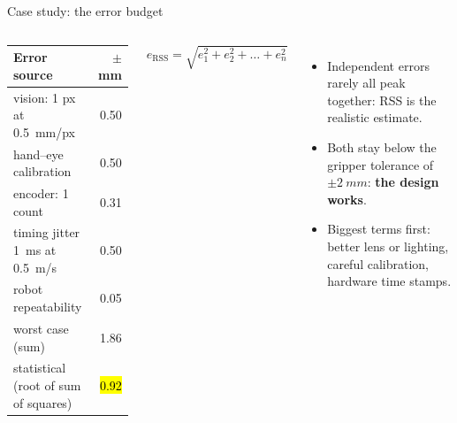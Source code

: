 \documentclass[aspectratio=169,10pt]{beamer}
\begin{document}
\begin{frame}{Case study: the error budget}
\begin{columns}[T]
\small
\renewcommand{\arraystretch}{1.12}
\begin{tabularx}{\linewidth}{@{}X r@{}}
\toprule
\textbf{Error source} & \textbf{$\pm$ mm}\\
\midrule
vision: 1 px at \SI{0.5}{mm/px} & 0.50\\
hand--eye calibration & 0.50\\
encoder: 1 count & 0.31\\
timing jitter \SI{1}{ms} at \SI{0.5}{m/s} & 0.50\\
robot repeatability & 0.05\\
\midrule
worst case (sum) & 1.86\\
statistical (root of sum of squares) & \hl{0.92}\\
\bottomrule
\end{tabularx}
\begin{eqbox}
\vspace{-2mm}
\[ e_\text{RSS}=\sqrt{e_1^2+e_2^2+\dots+e_n^2} \]
\vspace{-4mm}
\end{eqbox}
\begin{itemize}\small
\item Independent errors rarely all peak together: RSS is the realistic estimate.
\item Both stay below the gripper tolerance of $\pm\SI{2}{mm}$: \textcolor{mkGreen}{\textbf{the design works}}.
\item Biggest terms first: better lens or lighting, careful calibration, hardware time stamps.
\end{itemize}
\end{columns}
\end{frame}
\end{document}
